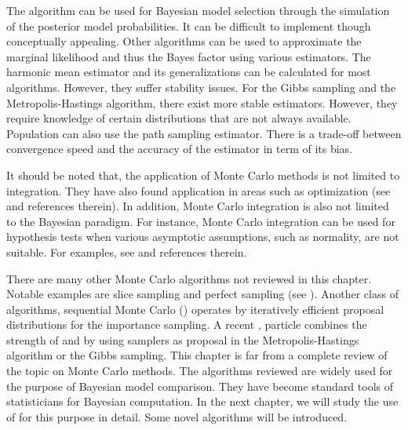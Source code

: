 The \rjmcmc algorithm can be used for Bayesian model selection through the simulation of the posterior model probabilities. It can be difficult to implement though conceptually appealing. Other algorithms can be used to approximate the marginal likelihood and thus the Bayes factor using various estimators. The harmonic mean estimator and its generalizations can be calculated for most \mcmc algorithms. However, they suffer stability issues. For the Gibbs sampling and the Metropolis-Hastings algorithm, there exist more stable estimators. However, they require knowledge of certain distributions that are not always available. Population \mcmc can also use the path sampling estimator. There is a trade-off between convergence speed and the accuracy of the estimator in term of its bias.

It should be noted that, the application of Monte Carlo methods is not limited to integration. They have also found application in areas such as optimization (see \cite[][chap.~5]{Robert:2004tn} and references therein). In addition, Monte Carlo integration is also not limited to the Bayesian paradigm. For instance, Monte Carlo integration can be used for hypothesis tests when various asymptotic assumptions, such as normality, are not suitable. For examples, see \cite[][sec.~3.2]{Robert:2004tn} and references therein.

There are many other Monte Carlo algorithms not reviewed in this chapter. Notable examples are slice sampling and perfect sampling (see \cite[][chap.~8 and~13]{Robert:2004tn}). Another class of algorithms, sequential Monte Carlo (\smc) operates by iteratively  efficient proposal distributions for the importance sampling. A recent , particle \mcmc \cite{Andrieu:2010gc} combines the strength of \mcmc and \smc by using \smc samplers as proposal in the Metropolis-Hastings algorithm or the Gibbs sampling. This chapter is far from a complete review of the topic on Monte Carlo methods. The algorithms reviewed are widely used for the purpose of Bayesian model comparison. They have become standard tools of statisticians for Bayesian computation. In the next chapter, we will study the use of \smc for this purpose in detail. Some novel algorithms will be introduced.
